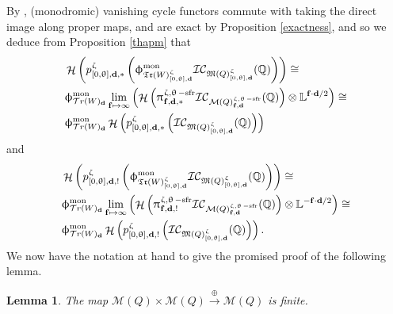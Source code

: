 \documentclass[a4paper,10pt]{amsart}
\newtheorem{lemma}[theorem]{Lemma}
\newcommand{\dd}{\mathbf{d}}
\newcommand{\ff}{\mathbf{f}}
\newcommand{\LL}{\mathbb{L}}
\DeclareMathOperator{\sfr}{-sfr}
\newcommand{\WW}{\mathcal{T}r(W)}
\newcommand{\WWW}{\mathfrak{Tr}(W)}
\newcommand{\Mst}{\mathfrak{M}}
\newcommand{\Msp}{\mathcal{M}}
\newcommand{\ICS}{\mathcal{IC}}
\newcommand{\phim}[1]{\phi^{\mon}_{#1}}
\renewcommand{\theta}{\uptheta}
\renewcommand{\zeta}{\upzeta}
\renewcommand{\pi}{\uppi\hspace{0.05em}}
\renewcommand{\phi}{\upphi}
\DeclareMathOperator{\mon}{mon}
\DeclareMathOperator{\Ho}{\mathcal{H}}
\begin{document}
By \cite{Sai90}, (monodromic) vanishing cycle functors commute with taking the direct image along proper maps, and are exact by Proposition \ref{exactness}, and so we deduce from Proposition \ref{thapm} that
\begin{align}
\label{bettStarForm}
&\Ho\left(p_{[0,\theta],\dd,*}^{\zeta}\left(\phim{\WWW^{\zeta}_{[0,\theta],\dd}}\ICS_{\Mst(Q)_{[0, \theta],\dd}^{\zeta}}(\mathbb{Q})\right)\right)\cong\\&\phim{\WW_{\dd}}\lim_{\ff\mapsto\infty}\left(\Ho\left(\pi_{\ff,\dd,*}^{\zeta,\theta\sfr}\ICS_{\Msp(Q)^{\zeta,\theta\sfr}_{\ff,\dd}}(\mathbb{Q})\right)\otimes \LL^{\ff\cdot\dd/2}\right)\nonumber\cong\\&
\phim{\WW_{\dd}}\Ho\left(p_{[0,\theta],\dd,*}^{\zeta}\left(\ICS_{\Mst(Q)_{[0, \theta],\dd}^{\zeta}}(\mathbb{Q})\right)\right)\nonumber
\end{align}
and
\begin{align}
&\Ho\left(p_{[0, \theta],\dd,!}^{\zeta}\left(\phim{\WWW^{\zeta}_{[0,\theta],\dd}}\ICS_{\Mst(Q)_{[0, \theta],\dd}^{\zeta}}(\mathbb{Q})\right)\right)\cong\\&\phim{\WW_{\dd}}\lim_{\ff\mapsto\infty}\left(\Ho\left(\pi_{\ff,\dd,!}^{\zeta,\theta\sfr}\ICS_{\Msp(Q)^{\zeta,\theta\sfr}_{\ff,\dd}}(\mathbb{Q})\right)\otimes \LL^{-\ff\cdot\dd/2}\right)\nonumber\cong\\&
\phim{\WW_{\dd}}\Ho\left(p_{[0,\theta],\dd,!}^{\zeta}\left(\ICS_{\Mst(Q)_{[0, \theta],\dd}^{\zeta}}(\mathbb{Q})\right)\right)\nonumber.
\end{align}
We now have the notation at hand to give the promised proof of the following lemma.
\begin{lemma}\cite[Lem.2.1]{MeRe14}\label{finLem}
The map $\Msp(Q)\times \Msp(Q)\xrightarrow{\oplus} \Msp(Q)$ is finite.
\end{lemma}
\end{document}
